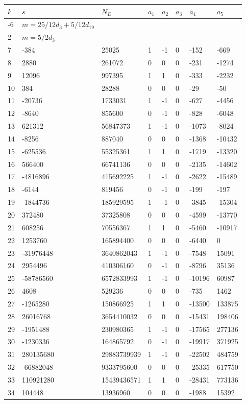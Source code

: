 \documentclass{amsart}
\begin{document}
\begin{longtable}{|l|l|l|lllll|}
\hline
$k$ & $s$ & $N_E$ & $a_1$ & $a_2$ & $a_3$ & $a_4$ & $a_5$\\
\hline
-6&$m=25/12d_{3}+5/12d_{19}$&&\multicolumn{5}{c|}{}\\
2&$m=5/2d_{3}$&&\multicolumn{5}{c|}{}\\
7&-384&25025&1&-1&0&-152&-669\\
8&2880&261072&0&0&0&-231&-1274\\
9&12096&997395&1&1&0&-333&-2232\\
10&384&28288&0&0&0&-29&-50\\
11&-20736&1733031&1&-1&0&-627&-4456\\
12&-8640&855600&0&-1&0&-828&-6048\\
13&621312&56847373&1&-1&0&-1073&-8024\\
14&-8256&887040&0&0&0&-1368&-10432\\
15&-625536&55325361&1&1&0&-1719&-13320\\
16&566400&66741136&0&0&0&-2135&-14602\\
17&-4816896&415692225&1&-1&0&-2622&-15489\\
18&-6144&819456&0&-1&0&-199&-197\\
19&-1844736&185929595&1&-1&0&-3845&-15304\\
20&372480&37325808&0&0&0&-4599&-13770\\
21&608256&70556367&1&1&0&-5460&-10917\\
22&1253760&165894400&0&0&0&-6440&0\\
23&-31976448&3640862043&1&-1&0&-7548&15091\\
24&2954496&410306160&0&-1&0&-8796&35136\\
25&-58786560&6572833993&1&-1&0&-10196&60987\\
26&4608&529236&0&0&0&-735&1462\\
27&-1265280&150866925&1&1&0&-13500&133875\\
28&26016768&3654410032&0&0&0&-15431&198406\\
29&-1951488&230980365&1&-1&0&-17565&277136\\
30&-1230336&164865792&0&-1&0&-19917&371925\\
31&280135680&29883739939&1&-1&0&-22502&484759\\
32&-66882048&9333795600&0&0&0&-25335&617750\\
33&110921280&15439436571&1&1&0&-28431&773136\\
34&104448&13936960&0&0&0&-1988&15392\\

\end{longtable}
\end{document}
